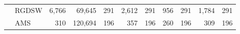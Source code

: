 \begin{table}[H]
\begin{tabular}{llrrrrrrrrr}
\cline{2-11}
\bfseries  & RGDSW & 6,766 & {\cellcolor[HTML]{379E54}} \color[HTML]{F1F1F1} 69,645 & 291 & {\cellcolor[HTML]{FFFFE5}} \color[HTML]{000000} 2,612 & 291 & {\cellcolor[HTML]{BCE395}} \color[HTML]{000000} 956 & 291 & {\cellcolor[HTML]{004529}} \color[HTML]{F1F1F1} 1,784 & 291 \\
\cline{2-11}
\bfseries  & AMS & 310 & {\cellcolor[HTML]{FFFFE5}} \color[HTML]{000000} 120,694 & 196 & {\cellcolor[HTML]{379E54}} \color[HTML]{F1F1F1} 357 & 196 & {\cellcolor[HTML]{BCE395}} \color[HTML]{000000} 260 & 196 & {\cellcolor[HTML]{004529}} \color[HTML]{F1F1F1} 309 & 196 \\
\cline{1-11} \cline{2-11}
\bottomrule
\end{tabular}
\end{table}
